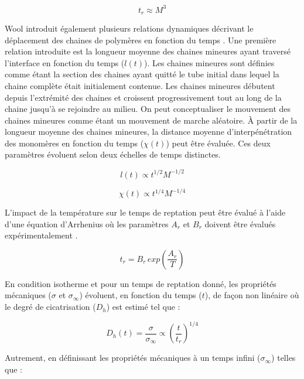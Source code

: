 \begin{equation}
t_r \approx M^3
\end{equation}

Wool introduit également plusieurs relations dynamiques décrivant le déplacement des chaines de polymères en fonction du temps \cite{Wool1983,Wool1989}. 
Une première relation introduite est la longueur moyenne des chaines mineures ayant traversé l'interface en fonction du temps ($l(t)$). 
Les chaines mineures sont définies comme étant la section des chaines ayant quitté le tube initial dans lequel la chaine complète était initialement contenue. 
Les chaines mineures débutent depuis l'extrémité des chaines et croissent progressivement tout au long de la chaine jusqu'à se rejoindre au milieu. 
On peut conceptualiser le mouvement des chaines mineures comme étant un mouvement de marche aléatoire. 
À partir de la longueur moyenne des chaines mineures, la distance moyenne d'interpénétration des monomères en fonction du temps ($\chi(t)$) peut être évaluée. 
Ces deux paramètres évoluent selon deux échelles de temps distinctes. 

\begin{equation}
l(t) \propto t^{1/2} M^{-1/2}
\end{equation}

\begin{equation}
\chi(t) \propto t^{1/4} M^{-1/4}
\end{equation}

L'impact de la température sur le temps de reptation peut être évalué à l'aide d'une équation d'Arrhenius où les paramètres $A_r$ et $B_r$  doivent être évalués expérimentalement \cite{Bastien1991,Ageorges1998}. 

\begin{equation}
t_r = B_r \, exp \left( \frac{A_r}{T} \right)
\end{equation}

En condition isotherme et pour un temps de reptation donné, les propriétés mécaniques ($\sigma$ et $\sigma_{\infty}$) évoluent, en fonction du temps ($t$), de façon non linéaire où le degré de cicatrisation ($D_{h}$) est estimé tel que \cite{F.Yang2002} : 

\begin{equation}
D_h \left( t \right) = \frac{\sigma}{\sigma_{\infty}} \propto \left( \frac{t}{t_r} \right)^{1/4}
\end{equation}

Autrement, en définissant les propriétés mécaniques à un temps infini ($\sigma_{\infty}$) telles que \cite{Wool1983} :

